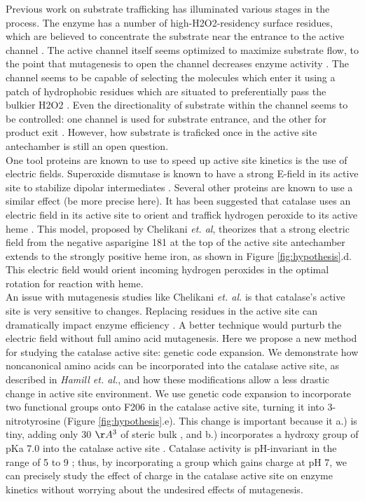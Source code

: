 \documentclass[9pt,twocolumn,twoside]{pnas-new}
\begin{document}
Previous work on substrate trafficking has illuminated various stages in the process. The enzyme has a number of high-H2O2-residency surface residues, which are believed to concentrate the substrate near the entrance to the active channel \cite{concentrateh2o2}. The active channel itself seems optimized to maximize substrate flow, to the point that mutagenesis to open the channel decreases enzyme activity \cite{substrateflow}. The channel seems to be capable of selecting the molecules which enter it using a patch of hydrophobic residues which are situated to preferentially pass the bulkier H2O2 \cite{molecularruler}. Even the directionality of substrate within the channel seems to be controlled: one channel is used for substrate entrance, and the other for product exit \cite{lateralchannel}. However, how substrate is traficked once in the active site antechamber is still an open question.\\

One tool proteins are known to use to speed up active site kinetics is the use of electric fields. Superoxide dismutase is known to have a strong E-field in its active site to stabilize dipolar intermediates \cite{conserved-as-efield-sod, concentrated-as-efield-sod}. Several other proteins are known to use a similar effect \cite{efield-review} (be more precise here). It has been suggested that catalase uses an electric field in its active site to orient and traffick hydrogen peroxide to its active heme \cite{electricpotential}. This model, proposed by Chelikani \textit{et. al}, theorizes that a strong electric field from the negative asparigine 181 at the top of the active site antechamber extends to the strongly positive heme iron, as shown in Figure \ref{fig:hypothesis}.d. This electric field would orient incoming hydrogen peroxides in the optimal rotation for reaction with heme.\\

An issue with mutagenesis studies like Chelikani \textit{et. al.} is that catalase's active site is very sensitive to changes. Replacing residues in the active site can dramatically impact enzyme efficiency \cite{substrateflow}. A better technique would purturb the electric field without full amino acid mutagenesis. Here we propose a new method for studying the catalase active site: genetic code expansion. We demonstrate how noncanonical amino acids can be incorporated into the catalase active site, as described in \textit{Hamill et. al.}, and how these modifications allow a less drastic change in active site environment. We use genetic code expansion \cite{hammill} to incorporate two functional groups onto F206 in the catalase active site, turning it into 3-nitrotyrosine (Figure \ref{fig:hypothesis}.e). This change is important because it a.) is tiny, adding only 30 $\AA^3$ of steric bulk \cite{3ntsize}, and b.) incorporates a hydroxy group of pKa 7.0 into the catalase active site \cite{3ntsize}. Catalase activity is pH-invariant in the range of 5 to 9 \cite{phdependence,kcatkm}; thus, by incorporating a group which gains charge at pH 7, we can precisely study the effect of charge in the catalase active site on enzyme kinetics without worrying about the undesired effects of mutagenesis.\\
\end{document}
